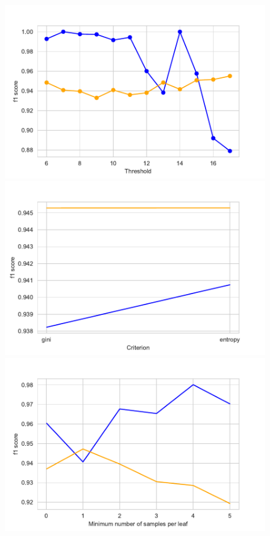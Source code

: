 \documentclass[11pt]{article}
\begin{document}
\begin{figure}
\begin{minipage}[l]{0.3\textwidth}
\includegraphics[width=1\linewidth]{voting/thresholds_rdf.pdf}
\end{minipage}
\begin{minipage}[l]{0.3\textwidth}
\includegraphics[width=1\linewidth]{voting/criterion_rdf.pdf}
\end{minipage}
\begin{minipage}[l]{0.3\textwidth}
\includegraphics[width=1\linewidth]{voting/min_samples_leaf_rdf.pdf}

\end{minipage}
\end{figure}
\end{document}
